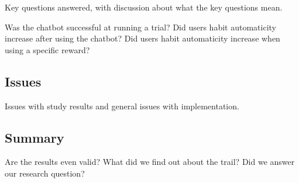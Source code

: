 Key questions answered, with discussion about what the key questions mean.\newline

\large{Was the chatbot successful at running a trial?}\newline
\large{Did users habit automaticity increase after using the chatbot?}\newline
\large{Did users habit automaticity increase when using a specific reward?}


\subsection{Issues}
Issues with study results and general issues with implementation.


\subsection{Summary}

Are the results even valid? What did we find out about the trail? Did we answer our research question?


